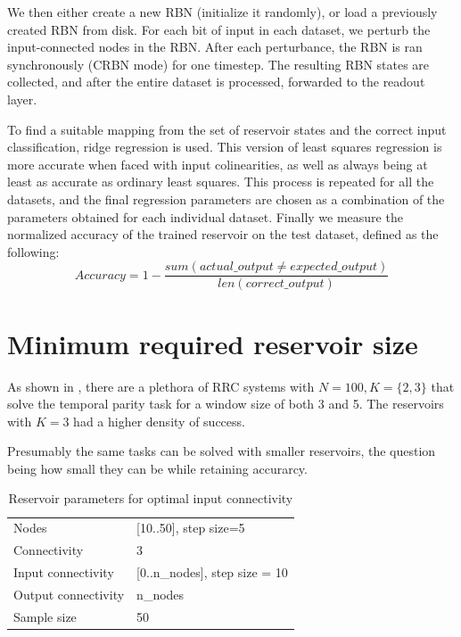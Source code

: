 We then either create a new RBN (initialize it randomly),
or load a previously created RBN from disk.
For each bit of input in each dataset,
we perturb the input-connected nodes in the RBN.
After each perturbance, the RBN is ran synchronously (CRBN mode) for one timestep.
The resulting RBN states are collected,
and after the entire dataset is processed,
forwarded to the readout layer.

To find a suitable mapping from the set of reservoir states and the correct input classification,
ridge regression \cite{hoerl1970ridge} is used.
This version of least squares regression is more accurate when faced with input colinearities, as well as always being at least as accurate as ordinary least squares.  
This process is repeated for all the datasets,
and the final regression parameters are chosen as a combination of the parameters obtained for each individual dataset.
Finally we measure the normalized accuracy of the trained reservoir on the test dataset,
defined as the following:
\begin{equation}
Accuracy = 1 - \dfrac{sum(actual\_output \neq expected\_output)}{len(correct\_output)}
\label{formula:accuracy}
\end{equation}

\section{Minimum required reservoir size}

As shown in \cite{MyPreviousPaper},
there are a plethora of RRC systems with $N=100, K=\{2, 3\}$ that solve the temporal parity task for a window size of both 3 and 5.
The reservoirs with $K=3$ had a higher density of success.

Presumably the same tasks can be solved with smaller reservoirs,
the question being how small they can be while retaining accurarcy.


\begin{table}[ht]
    \centering
    \caption{Reservoir parameters for optimal input connectivity}
    \begin{tabular}{ll}
        Nodes               & [10..50], step size=5         \\
        Connectivity        & 3                             \\
        Input connectivity  & [0..n\_nodes], step size = 10 \\
		Output connectivity & n\_nodes                      \\
        Sample size         & 50
    \end{tabular}
\end{table}


